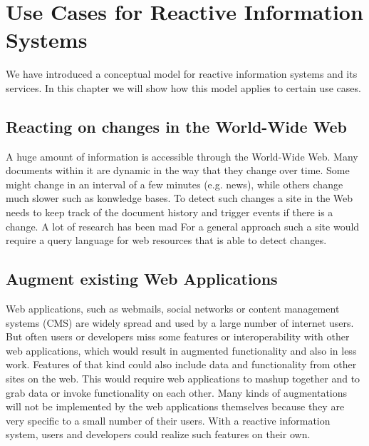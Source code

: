 \chapter{Use Cases for Reactive Information Systems}
We have introduced a conceptual model for reactive information systems and its services.
In this chapter we will show how this model applies to certain use cases.

\section{Reacting on changes in the World-Wide Web}
A huge amount of information is accessible through the World-Wide Web.
Many documents within it are dynamic in the way that they change over time.
Some might change in an interval of a few minutes (e.g. news), while others change much slower such as konwledge bases.
To detect such changes a site in the Web needs to keep track of the document history and trigger events if there is a change.
A lot of research has been mad
For a general approach such a site would require a query language for web resources that is able to detect changes.


\section{Augment existing Web Applications}
Web applications, such as webmails, social networks or content management systems (\textrm{CMS}) are widely spread and used by a large number of internet users.
But often users or developers miss some features or interoperability with other web applications, which would result in augmented functionality and also in less work.
Features of that kind could also include data and functionality from other sites on the web.
This would require web applications to mashup together and to grab data or invoke functionality on each other.
Many kinds of augmentations will not be implemented by the web applications themselves because they are very specific to a small number of their users.
With a reactive information system, users and developers could realize such features on their own.


